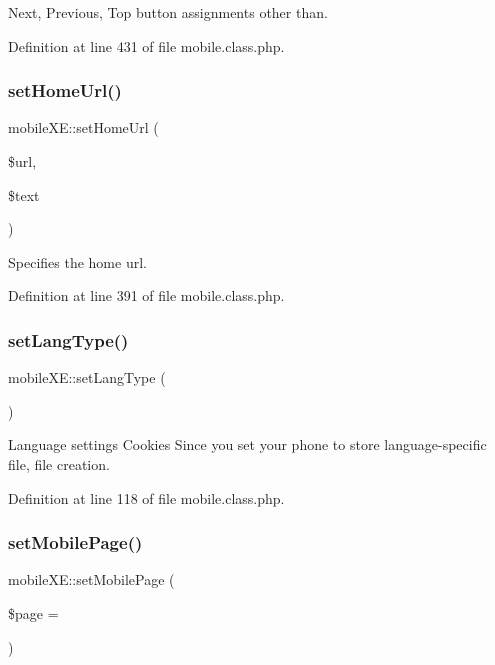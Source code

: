 Next, Previous, Top button assignments other than. 



Definition at line 431 of file mobile.\+class.\+php.

\hypertarget{classmobileXE_a7833bbd0ed8b32aa5461b8b89a4c2fa0}{}\label{classmobileXE_a7833bbd0ed8b32aa5461b8b89a4c2fa0} 
\subsubsection{\texorpdfstring{set\+Home\+Url()}{setHomeUrl()}}
{\footnotesize\ttfamily mobile\+X\+E\+::set\+Home\+Url (\begin{DoxyParamCaption}\item[{}]{\$url,  }\item[{}]{\$text }\end{DoxyParamCaption})}



Specifies the home url. 



Definition at line 391 of file mobile.\+class.\+php.

\hypertarget{classmobileXE_a4d844050feafe1844867f6352d4983c9}{}\label{classmobileXE_a4d844050feafe1844867f6352d4983c9} 
\subsubsection{\texorpdfstring{set\+Lang\+Type()}{setLangType()}}
{\footnotesize\ttfamily mobile\+X\+E\+::set\+Lang\+Type (\begin{DoxyParamCaption}{ }\end{DoxyParamCaption})}



Language settings Cookies Since you set your phone to store language-\/specific file, file creation. 



Definition at line 118 of file mobile.\+class.\+php.

\hypertarget{classmobileXE_a462ec879b69ab476662754aec66800dd}{}\label{classmobileXE_a462ec879b69ab476662754aec66800dd} 
\subsubsection{\texorpdfstring{set\+Mobile\+Page()}{setMobilePage()}}
{\footnotesize\ttfamily mobile\+X\+E\+::set\+Mobile\+Page (\begin{DoxyParamCaption}\item[{}]{\$page = {} }\end{DoxyParamCaption})}



